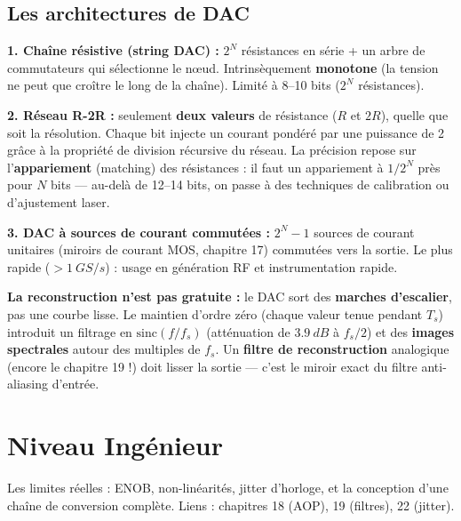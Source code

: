 \documentclass[12pt,a4paper,twoside]{book}
\begin{document}
\subsection{Les architectures de DAC}

\begin{formule}
\textbf{1. Chaîne résistive (string DAC) :} $2^N$ résistances en série + un arbre de commutateurs qui sélectionne le nœud. Intrinsèquement \textbf{monotone} (la tension ne peut que croître le long de la chaîne). Limité à 8--10 bits ($2^N$ résistances).

\textbf{2. Réseau R-2R :} seulement \textbf{deux valeurs} de résistance ($R$ et $2R$), quelle que soit la résolution. Chaque bit injecte un courant pondéré par une puissance de 2 grâce à la propriété de division récursive du réseau. La précision repose sur l'\textbf{appariement} (matching) des résistances : il faut un appariement à $1/2^N$ près pour $N$ bits --- au-delà de 12--14 bits, on passe à des techniques de calibration ou d'ajustement laser.

\textbf{3. DAC à sources de courant commutées :} $2^N - 1$ sources de courant unitaires (miroirs de courant MOS, chapitre 17) commutées vers la sortie. Le plus rapide ($> \SI{1}{GS/s}$) : usage en génération RF et instrumentation rapide.
\end{formule}

\begin{attention}
\textbf{La reconstruction n'est pas gratuite :} le DAC sort des \textbf{marches d'escalier}, pas une courbe lisse. Le maintien d'ordre zéro (chaque valeur tenue pendant $T_s$) introduit un filtrage en $\text{sinc}(f/f_s)$ (atténuation de $\SI{3.9}{dB}$ à $f_s/2$) et des \textbf{images spectrales} autour des multiples de $f_s$. Un \textbf{filtre de reconstruction} analogique (encore le chapitre 19 !) doit lisser la sortie --- c'est le miroir exact du filtre anti-aliasing d'entrée.
\end{attention}

\section{Niveau Ingénieur}

\begin{ingenieur}
Les limites réelles : ENOB, non-linéarités, jitter d'horloge, et la conception d'une chaîne de conversion complète. Liens : chapitres 18 (AOP), 19 (filtres), 22 (jitter).
\end{ingenieur}
\end{document}
